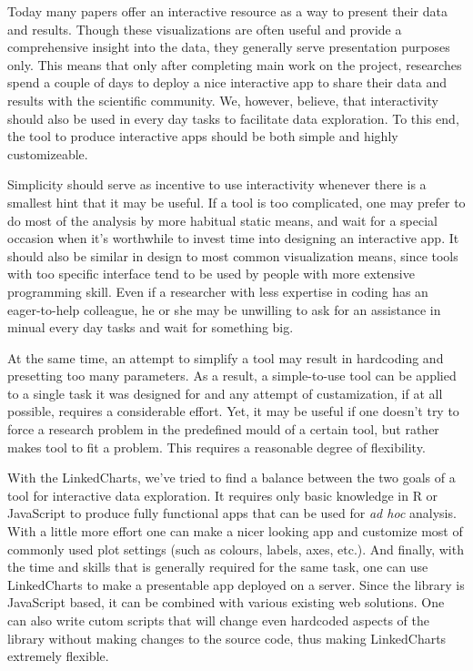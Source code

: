 \documentclass[twocolumn,10pt]{article}
\begin{document}
Today many papers offer an interactive resource as a way to present their data and results. Though these visualizations are often useful and provide a comprehensive insight into the data, they generally serve presentation purposes only. This means that only after completing main work on the project, researches spend a couple of days to deploy a nice interactive app to share their data and results with the scientific community. We, however, believe, that interactivity should also be used in every day tasks to facilitate data exploration. To this end, the tool to produce interactive apps should be both simple and highly customizeable.

Simplicity should serve as incentive to use interactivity whenever there is a smallest hint that it may be useful. If a tool is too complicated, one may prefer to do most of the analysis by more habitual static means, and wait for a special occasion when it's worthwhile to invest time into designing an interactive app. It should also be similar in design to most common visualization means, since tools with too specific interface tend to be used by people with more extensive programming skill. Even if a researcher with less expertise in coding has an eager-to-help colleague, he or she may be unwilling to ask for an assistance in minual every day tasks and wait for something big.

At the same time, an attempt to simplify a tool may result in hardcoding and presetting too many parameters. As a result, a simple-to-use tool can be applied to a single task it was designed for and any attempt of custamization, if at all possible, requires a considerable effort. Yet, it may be useful if one doesn't try to force a research problem in the predefined mould of a certain tool, but rather makes tool to fit a problem. This requires a reasonable degree of flexibility.

With the LinkedCharts, we've tried to find a balance between the two goals of a tool for interactive data exploration. It requires only basic knowledge in R or JavaScript to produce fully functional apps that can be used for \emph{ad hoc} analysis. With a little more effort one can make a nicer looking app and customize most of commonly used plot settings (such as colours, labels, axes, etc.). And finally, with the time and skills that is generally required for the same task, one can use LinkedCharts to make a presentable app deployed on a server. Since the library is JavaScript based, it can be combined with various existing web solutions. One can also write cutom scripts that will change even hardcoded aspects of the library without making changes to the source code, thus making LinkedCharts extremely flexible. 
\end{document}
